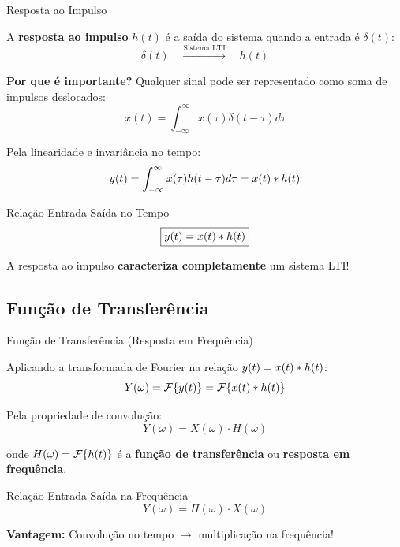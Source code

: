 \begin{frame}{Resposta ao Impulso}

A \textbf{resposta ao impulso} $h(t)$ é a saída do sistema quando a entrada é $\delta(t)$:
\vspace{-2mm}
\[
\delta(t) \quad \xrightarrow{\text{Sistema LTI}} \quad h(t)
\]
\vspace{-4mm}

\textbf{Por que é importante?}
Qualquer sinal pode ser representado como soma de impulsos deslocados:
\vspace{-2mm}
\[
x(t) = \int_{-\infty}^{\infty} x(\tau) \delta(t - \tau) d\tau
\]
\vspace{-4mm}

Pela linearidade e invariância no tempo:
\vspace{-2mm}
\[
y(t) = \int_{-\infty}^{\infty} x(\tau) h(t - \tau) d\tau = x(t) \ast h(t)
\]
\vspace{-4mm}

\begin{block}{Relação Entrada-Saída no Tempo}
\vspace{-2mm}
\[
\boxed{y(t) = x(t) \ast h(t)}
\]
\vspace{-2mm}
\end{block}

A resposta ao impulso \textbf{caracteriza completamente} um sistema LTI!

\end{frame}


\subsection{Função de Transferência}

\begin{frame}{Função de Transferência (Resposta em Frequência)}

Aplicando a transformada de Fourier na relação $y(t) = x(t) \ast h(t)$:
\vspace{-2mm}
\[
Y(\omega) = \mathcal{F}\{y(t)\} = \mathcal{F}\{x(t) \ast h(t)\}
\]
\vspace{-4mm}

Pela propriedade de convolução:
\vspace{-2mm}
\[
Y(\omega) = X(\omega) \cdot H(\omega)
\]
\vspace{-4mm}

onde $H(\omega) = \mathcal{F}\{h(t)\}$ é a \textbf{função de transferência} ou \textbf{resposta em frequência}.

\begin{block}{Relação Entrada-Saída na Frequência}
\vspace{-2mm}
\[
\boxed{Y(\omega) = H(\omega) \cdot X(\omega)}
\]
\vspace{-2mm}
\end{block}

\textbf{Vantagem:} Convolução no tempo $\rightarrow$ multiplicação na frequência!

\end{frame}

